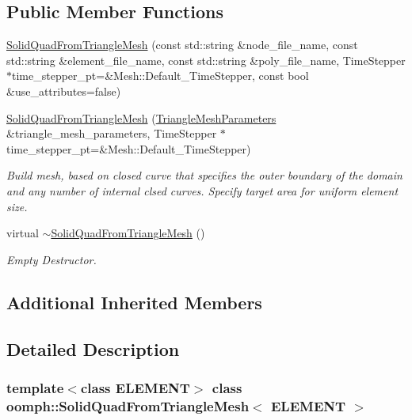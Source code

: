 \subsection*{Public Member Functions}
\begin{DoxyCompactItemize}
\item 
\hyperlink{classoomph_1_1SolidQuadFromTriangleMesh_ad4bc87ca77ca074e6153c383d04c1499}{Solid\+Quad\+From\+Triangle\+Mesh} (const std\+::string \&node\+\_\+file\+\_\+name, const std\+::string \&element\+\_\+file\+\_\+name, const std\+::string \&poly\+\_\+file\+\_\+name, Time\+Stepper $\ast$time\+\_\+stepper\+\_\+pt=\&Mesh\+::\+Default\+\_\+\+Time\+Stepper, const bool \&use\+\_\+attributes=false)
\item 
\hyperlink{classoomph_1_1SolidQuadFromTriangleMesh_a2840a2b887344189d0921c9d6ff2cf63}{Solid\+Quad\+From\+Triangle\+Mesh} (\hyperlink{classoomph_1_1TriangleMeshParameters}{Triangle\+Mesh\+Parameters} \&triangle\+\_\+mesh\+\_\+parameters, Time\+Stepper $\ast$time\+\_\+stepper\+\_\+pt=\&Mesh\+::\+Default\+\_\+\+Time\+Stepper)
\begin{DoxyCompactList}\small\item\em Build mesh, based on closed curve that specifies the outer boundary of the domain and any number of internal clsed curves. Specify target area for uniform element size. \end{DoxyCompactList}\item 
virtual \hyperlink{classoomph_1_1SolidQuadFromTriangleMesh_af9aaccc5a15dfefab81b91b059217aa3}{$\sim$\+Solid\+Quad\+From\+Triangle\+Mesh} ()
\begin{DoxyCompactList}\small\item\em Empty Destructor. \end{DoxyCompactList}\end{DoxyCompactItemize}
\subsection*{Additional Inherited Members}


\subsection{Detailed Description}
\subsubsection*{template$<$class E\+L\+E\+M\+E\+NT$>$\newline
class oomph\+::\+Solid\+Quad\+From\+Triangle\+Mesh$<$ E\+L\+E\+M\+E\+N\+T $>$}

